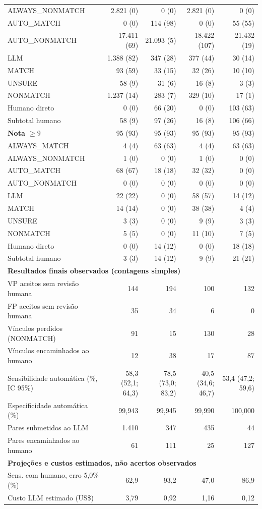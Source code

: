 \begin{longtable}{lrrrr}
\quad ALWAYS\_NONMATCH & 2.821 (0) & 0 (0) & 2.821 (0) & 0 (0) \\
\quad AUTO\_MATCH & 0 (0) & 114 (98) & 0 (0) & 55 (55) \\
\quad AUTO\_NONMATCH & 17.411 (69) & 21.093 (5) & 18.422 (107) & 21.432 (19) \\
\quad LLM & 1.388 (82) & 347 (28) & 377 (44) & 30 (14) \\
\qquad MATCH & 93 (59) & 33 (15) & 32 (26) & 10 (10) \\
\qquad UNSURE & 58 (9) & 31 (6) & 16 (8) & 3 (3) \\
\qquad NONMATCH & 1.237 (14) & 283 (7) & 329 (10) & 17 (1) \\
\quad Humano direto & 0 (0) & 66 (20) & 0 (0) & 103 (63) \\
Subtotal humano & 58 (9) & 97 (26) & 16 (8) & 106 (66) \\
\hline
\textbf{Nota $\geq9$} & 95 (93) & 95 (93) & 95 (93) & 95 (93) \\
\quad ALWAYS\_MATCH & 4 (4) & 63 (63) & 4 (4) & 63 (63) \\
\quad ALWAYS\_NONMATCH & 1 (0) & 0 (0) & 1 (0) & 0 (0) \\
\quad AUTO\_MATCH & 68 (67) & 18 (18) & 32 (32) & 0 (0) \\
\quad AUTO\_NONMATCH & 0 (0) & 0 (0) & 0 (0) & 0 (0) \\
\quad LLM & 22 (22) & 0 (0) & 58 (57) & 14 (12) \\
\qquad MATCH & 14 (14) & 0 (0) & 38 (38) & 4 (4) \\
\qquad UNSURE & 3 (3) & 0 (0) & 9 (9) & 3 (3) \\
\qquad NONMATCH & 5 (5) & 0 (0) & 11 (10) & 7 (5) \\
\quad Humano direto & 0 (0) & 14 (12) & 0 (0) & 18 (18) \\
Subtotal humano & 3 (3) & 14 (12) & 9 (9) & 21 (21) \\
\hline
\multicolumn{5}{l}{\textbf{Resultados finais observados (contagens simples)}} \\
VP aceitos sem revisão humana & 144 & 194 & 100 & 132 \\
FP aceitos sem revisão humana & 35 & 34 & 6 & 0 \\
Vínculos perdidos (NONMATCH) & 91 & 15 & 130 & 28 \\
Vínculos encaminhados ao humano & 12 & 38 & 17 & 87 \\
Sensibilidade automática (\%, IC 95\%) & 58,3 (52,1; 64,3) & 78,5 (73,0; 83,2) & 40,5 (34,6; 46,7) & 53,4 (47,2; 59,6) \\
Especificidade automática (\%) & 99,943 & 99,945 & 99,990 & 100,000 \\
Pares submetidos ao LLM & 1.410 & 347 & 435 & 44 \\
Pares encaminhados ao humano & 61 & 111 & 25 & 127 \\
\hline
\multicolumn{5}{l}{\textbf{Projeções e custos estimados, não acertos observados}} \\
Sens. com humano, erro 5,0\% (\%) & 62,9 & 93,2 & 47,0 & 86,9 \\
Custo LLM estimado (US\$) & 3,79 & 0,92 & 1,16 & 0,12 \\
\end{longtable}
